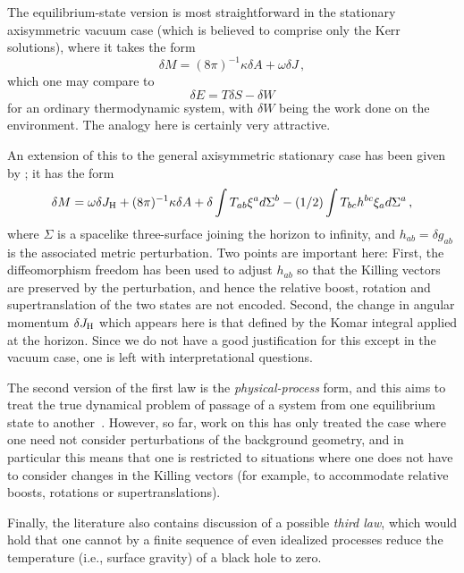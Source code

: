 \documentclass[12pt]{article}
\begin{document}
The equilibrium-state version is most straightforward in the stationary axisymmetric vacuum case (which is believed to comprise only the Kerr solutions), where it takes the form
\begin{equation}
\delta M=(8\pi )^{-1}\kappa\delta A +\omega\delta J\, ,
\end{equation}
which one may compare to
\begin{equation}
  \delta E=T\delta S -\delta W
\end{equation}
for an ordinary thermodynamic system, with $\delta W$ being the work done on the environment.  The analogy here is certainly very attractive.

An extension of this to the general axisymmetric stationary case has been given by \citet{Carter:1979}; it has the form
\begin{equation}  
  \delta M=\omega\delta J_{\rm H}+(8\pi )^{-1}\kappa \delta A
  +\delta\int T_{ab}\xi ^a d\Sigma ^b -(1/2)\int T_{bc} h^{bc} \xi _a d\Sigma ^a\, ,
\end{equation}
where $\Sigma$ is a spacelike three-surface joining the horizon to infinity, and $h_{ab}=\delta g_{ab}$ is the associated metric perturbation.  Two points are important here:  First, the diffeomorphism freedom has been used to adjust $h_{ab}$ so that the Killing vectors are preserved by the perturbation, and hence the relative boost, rotation and supertranslation of the two states are not encoded.  Second, the change in angular momentum $\delta J_{\rm H}$ which appears here is that defined by the Komar integral applied at the horizon.  Since we do not have a good justification for this except in the vacuum case, one is left with interpretational questions.

The second version of the first law is the {\em physical-process} form, and this aims to treat the true dynamical problem of passage of a system from one equilibrium state to another~\citep{Wald:1995yp,Gao:2001ut}.  However, so far, work on this has only treated the case where one need not consider perturbations of the background geometry, and in particular this means that one is restricted to situations where one does not have to consider changes in the Killing vectors (for example, to accommodate relative boosts, rotations or supertranslations).

Finally, the literature also contains discussion of a possible {\em third law}, which would hold
that one cannot by a finite sequence of even idealized processes reduce the temperature (i.e., surface gravity) of a black hole to zero.
\end{document}
